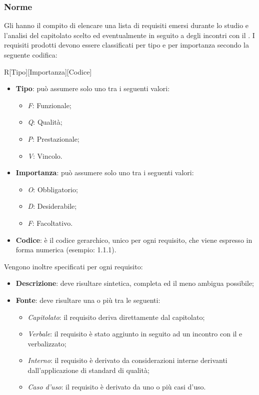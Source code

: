 \subsubsection{Norme}
Gli \rAs hanno il compito di elencare una lista di requisiti  emersi durante lo studio e l'analisi del capitolato scelto ed eventualmente in seguito a degli incontri con il .
I requisiti prodotti devono essere classificati per tipo e per importanza secondo la seguente codifica:
\begin{center}
R[Tipo][Importanza][Codice]
\end{center}
\vspace{0.2in}
\begin{itemize}
\item \textbf{Tipo}:  può assumere solo uno tra i seguenti valori:
\begin{itemize}
\item \textit{F}: Funzionale;
\item \textit{Q}: Qualità;
\item \textit{P}: Prestazionale;
\item \textit{V}: Vincolo.
\end{itemize}
\item \textbf{Importanza}: può assumere solo uno tra i seguenti valori:
\begin{itemize}
\item \textit{O}: Obbligatorio;
\item \textit{D}: Desiderabile;
\item \textit{F}: Facoltativo.
\end{itemize}
\item \textbf{Codice}: è il codice gerarchico, unico per ogni requisito, che viene espresso in forma numerica (esempio: 1.1.1).
\end{itemize}
Vengono inoltre specificati per ogni requisito:
\begin{itemize}
\item \textbf{Descrizione}: deve risultare sintetica, completa ed il meno ambigua possibile;
\item \textbf{Fonte}: deve risultare una o più tra le seguenti:
\begin{itemize}
\item \textit{Capitolato}: il requisito deriva direttamente dal capitolato;
\item \textit{Verbale}: il requisito è stato aggiunto in seguito ad un incontro con il  e verbalizzato;
\item \textit{Interno}: il requisito è derivato da considerazioni interne derivanti dall'applicazione di standard di qualità;
\item \textit{Caso d'uso}: il requisito è derivato da uno o più casi d'uso.
\end{itemize}
\end{itemize}
